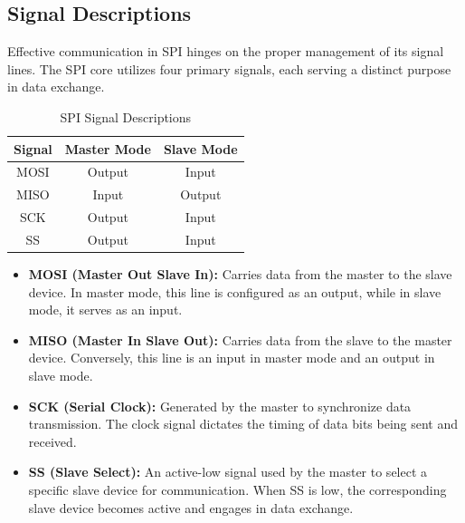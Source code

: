 \documentclass{article}
\begin{document}

\subsection{Signal Descriptions}
Effective communication in SPI hinges on the proper management of its signal lines. The SPI core utilizes four primary signals, each serving a distinct purpose in data exchange.

\begin{table}[H]
    \centering
    \caption{SPI Signal Descriptions}
    \begin{tabular}{@{}ccc@{}}
        \toprule
        \textbf{Signal} & \textbf{Master Mode} & \textbf{Slave Mode} \\ \midrule
        MOSI & Output & Input \\
        MISO & Input & Output \\
        SCK  & Output & Input \\
        SS   & Output & Input \\ \bottomrule
    \end{tabular}
    \label{tab:spi_signals}
\end{table}

\begin{itemize}
    \item \textbf{MOSI (Master Out Slave In):} Carries data from the master to the slave device. In master mode, this line is configured as an output, while in slave mode, it serves as an input.
    \item \textbf{MISO (Master In Slave Out):} Carries data from the slave to the master device. Conversely, this line is an input in master mode and an output in slave mode.
    \item \textbf{SCK (Serial Clock):} Generated by the master to synchronize data transmission. The clock signal dictates the timing of data bits being sent and received.
    \item \textbf{SS (Slave Select):} An active-low signal used by the master to select a specific slave device for communication. When SS is low, the corresponding slave device becomes active and engages in data exchange.
\end{itemize}
\end{document}
